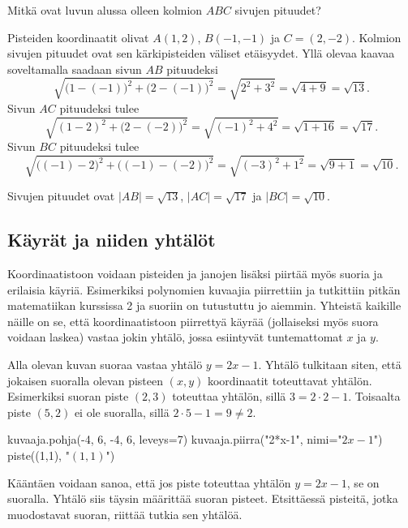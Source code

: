 \begin{esimerkki}
Mitkä ovat luvun alussa olleen kolmion $ABC$ sivujen pituudet?

\begin{esimratk}
Pisteiden koordinaatit olivat $A(1, 2)$, $B(-1, -1)$ ja $C=(2, -2)$.
Kolmion sivujen pituudet ovat sen kärkipisteiden väliset etäisyydet.
Yllä olevaa kaavaa soveltamalla saadaan sivun $AB$ pituudeksi
\[
\sqrt{\bigl(1-(-1)\bigr)^2+\bigl(2-(-1)\bigr)^2}=\sqrt{2^2+3^2}=\sqrt{4+9}=\sqrt{13}.
\]
Sivun $AC$ pituudeksi tulee
\[
\sqrt{(1-2)^2+\bigl(2-(-2)\bigr)^2}=\sqrt{(-1)^2+4^2}=\sqrt{1+16}=\sqrt{17}.
\]
Sivun $BC$ pituudeksi tulee
\[
\sqrt{\bigl((-1)-2\bigr)^2+\bigl((-1)-(-2)\bigr)^2}=\sqrt{(-3)^2+1^2}=\sqrt{9+1}=\sqrt{10}.
\]
\end{esimratk}

\begin{esimvast}
Sivujen pituudet ovat $|AB|=\sqrt{13}$, $|AC|=\sqrt{17}$ ja $|BC|=\sqrt{10}$.
\end{esimvast}
\end{esimerkki}

\subsection*{Käyrät ja niiden yhtälöt}

Koordinaatistoon voidaan pisteiden ja janojen lisäksi piirtää myös suoria ja erilaisia käyriä.
Esimerkiksi polynomien kuvaajia piirrettiin ja tutkittiin pitkän matematiikan kurssissa 2 ja suoriin on tutustuttu jo aiemmin.
Yhteistä kaikille näille on se, että koordinaatistoon piirrettyä käyrää (jollaiseksi myös suora voidaan laskea) vastaa jokin yhtälö, jossa esiintyvät tuntemattomat $x$ ja $y$.

Alla olevan kuvan suoraa vastaa yhtälö $y=2x-1$.
Yhtälö tulkitaan siten, että jokaisen suoralla olevan pisteen $(x, y)$ koordinaatit toteuttavat yhtälön.
Esimerkiksi suoran piste $(2, 3)$ toteuttaa yhtälön, sillä $3=2\cdot 2-1$.
Toisaalta piste $(5, 2)$ ei ole suoralla, sillä $2\cdot 5-1=9\neq 2$.


\begin{kuva}
	kuvaaja.pohja(-4, 6, -4, 6, leveys=7)
	kuvaaja.piirra("2*x-1", nimi="$2x-1$")
	piste((1,1), "$(1, 1)$")
\end{kuva}

Kääntäen voidaan sanoa, että jos piste toteuttaa yhtälön $y=2x-1$, se on suoralla.
Yhtälö siis täysin määrittää suoran pisteet.
Etsittäessä pisteitä, jotka muodostavat suoran, riittää tutkia sen yhtälöä.

